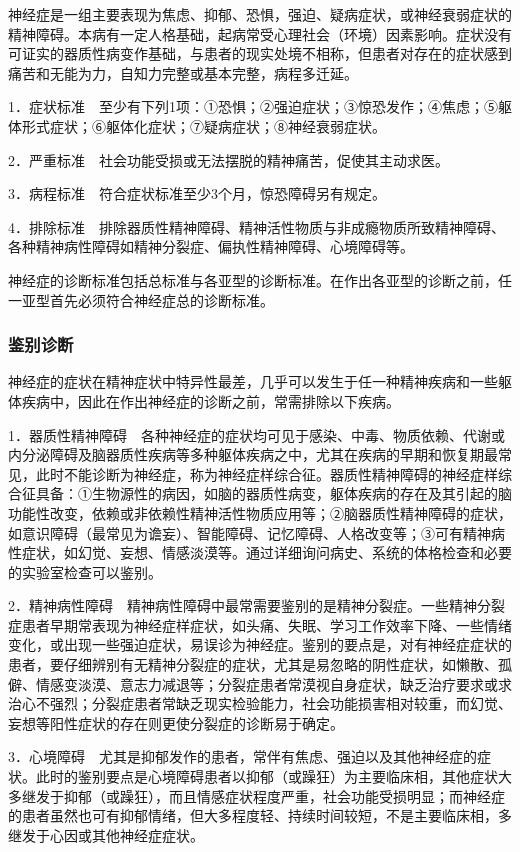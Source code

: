 神经症是一组主要表现为焦虑、抑郁、恐惧，强迫、疑病症状，或神经衰弱症状的精神障碍。本病有一定人格基础，起病常受心理社会（环境）因素影响。症状没有可证实的器质性病变作基础，与患者的现实处境不相称，但患者对存在的症状感到痛苦和无能为力，自知力完整或基本完整，病程多迁延。

1．症状标准　至少有下列1项：①恐惧；②强迫症状；③惊恐发作；④焦虑；⑤躯体形式症状；⑥躯体化症状；⑦疑病症状；⑧神经衰弱症状。

2．严重标准　社会功能受损或无法摆脱的精神痛苦，促使其主动求医。

3．病程标准　符合症状标准至少3个月，惊恐障碍另有规定。

4．排除标准　排除器质性精神障碍、精神活性物质与非成瘾物质所致精神障碍、各种精神病性障碍如精神分裂症、偏执性精神障碍、心境障碍等。

神经症的诊断标准包括总标准与各亚型的诊断标准。在作出各亚型的诊断之前，任一亚型首先必须符合神经症总的诊断标准。

\subsubsection{鉴别诊断}

神经症的症状在精神症状中特异性最差，几乎可以发生于任一种精神疾病和一些躯体疾病中，因此在作出神经症的诊断之前，常需排除以下疾病。

1．器质性精神障碍　各种神经症的症状均可见于感染、中毒、物质依赖、代谢或内分泌障碍及脑器质性疾病等多种躯体疾病之中，尤其在疾病的早期和恢复期最常见，此时不能诊断为神经症，称为神经症样综合征。器质性精神障碍的神经症样综合征具备：①生物源性的病因，如脑的器质性病变，躯体疾病的存在及其引起的脑功能性改变，依赖或非依赖性精神活性物质应用等；②脑器质性精神障碍的症状，如意识障碍（最常见为谵妄）、智能障碍、记忆障碍、人格改变等；③可有精神病性症状，如幻觉、妄想、情感淡漠等。通过详细询问病史、系统的体格检查和必要的实验室检查可以鉴别。

2．精神病性障碍　精神病性障碍中最常需要鉴别的是精神分裂症。一些精神分裂症患者早期常表现为神经症样症状，如头痛、失眠、学习工作效率下降、一些情绪变化，或出现一些强迫症状，易误诊为神经症。鉴别的要点是，对有神经症症状的患者，要仔细辨别有无精神分裂症的症状，尤其是易忽略的阴性症状，如懒散、孤僻、情感变淡漠、意志力减退等；分裂症患者常漠视自身症状，缺乏治疗要求或求治心不强烈；分裂症患者常缺乏现实检验能力，社会功能损害相对较重，而幻觉、妄想等阳性症状的存在则更使分裂症的诊断易于确定。

3．心境障碍　尤其是抑郁发作的患者，常伴有焦虑、强迫以及其他神经症的症状。此时的鉴别要点是心境障碍患者以抑郁（或躁狂）为主要临床相，其他症状大多继发于抑郁（或躁狂），而且情感症状程度严重，社会功能受损明显；而神经症的患者虽然也可有抑郁情绪，但大多程度轻、持续时间较短，不是主要临床相，多继发于心因或其他神经症症状。

